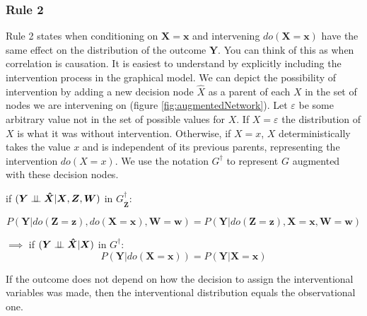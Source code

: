 \documentclass[11pt,a4paper,oneside]{book}
\theoremstyle{plain}
\theoremstyle{definition}
\let\epsilon\varepsilon
\begin{document}
\subsubsection{Rule 2}
Rule 2 states when conditioning on $\boldsymbol{X} = \boldsymbol{x}$ and intervening  $do(\boldsymbol{X}=\boldsymbol{x})$ have the same effect on the distribution of the outcome $\boldsymbol{Y}$. You can think of this as when correlation is causation. It is easiest to understand by explicitly including the intervention process in the graphical model. We can depict the possibility of intervention by adding a new decision node $\hat{X}$ as a parent of each $X$ in the set of nodes we are intervening on (figure \ref{fig:augmentedNetwork}). Let $\epsilon$ be some arbitrary value not in the set of possible values for $X$. If $X = \epsilon$ the distribution of $X$ is what it was without intervention. Otherwise, if $X=x$, $X$ deterministically takes the value $x$ and is independent of its previous parents, representing the intervention $do(X=x)$. We use the notation $G^{\dagger}$ to represent $G$ augmented with these decision nodes. 

if $(\boldsymbol{Y} \perp\!\!\!\perp \boldsymbol{\hat{X}}|\boldsymbol{X},\boldsymbol{Z},\boldsymbol{W})$ in $G^{\dagger}_{\boldsymbol{\overline{Z}}}$:

\begin{equation}
\label{eq:Do2}
P(\boldsymbol{Y}|do(\boldsymbol{Z}=\boldsymbol{z}),do(\boldsymbol{X}=\boldsymbol{x}),\boldsymbol{W}=\boldsymbol{w}) = P(\boldsymbol{Y}|do(\boldsymbol{Z}=\boldsymbol{z}),\boldsymbol{X}=\boldsymbol{x},\boldsymbol{W}=\boldsymbol{w})
\end{equation}

$\implies$ if  $(\boldsymbol{Y} \perp\!\!\!\perp \boldsymbol{\hat{X}}|\boldsymbol{X})$ in $G^{\dagger}$:
\begin{equation}
\label{eq:Do22}
P(\boldsymbol{Y}|do(\boldsymbol{X}=\boldsymbol{x})) = P(\boldsymbol{Y}|\boldsymbol{X}=\boldsymbol{x})
\end{equation}

If the outcome does not depend on how the decision to assign the interventional variables was made, then the interventional distribution equals the observational one. 
\end{document}
